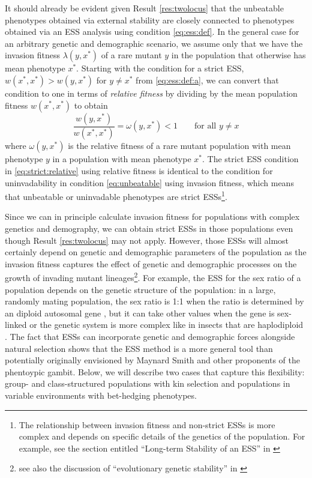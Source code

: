 \documentclass[11pt]{article}
\newcommand{\ess}[1]{#1^*}
\newcommand{\eig}{\lambda}
\begin{document}
It should already be evident given Result \ref{res:twolocus} that the unbeatable phenotypes obtained via external stability are closely connected to phenotypes obtained via an ESS analysis using condition \eqref{eq:ess:def}. In the general case for an arbitrary genetic and demographic scenario, we assume only that we have the invasion fitness $\eig(y, \ess{x})$ of a rare mutant $y$ in the population that otherwise has mean phenotype $\ess{x}$. Starting with the condition for a strict ESS, $w(\ess{x}, \ess{x}) > w(y, \ess{x})$ for $y \ne \ess{x}$ from \eqref{eq:ess:def:a}, we can convert that condition to one in terms of \textit{relative fitness} by dividing by the mean population fitness $w(\ess{x}, \ess{x})$ to obtain
\begin{equation}
  \label{eq:strict:relative}
  \frac{w(y, \ess{x})}{w(\ess{x}, \ess{x})} = \omega(y, \ess{x}) < 1 \qquad \text{for all } y \ne x
\end{equation}
where $\omega(y, \ess{x})$ is the relative fitness of a rare mutant population with mean phenotype $y$ in a population with mean phenotype $\ess{x}$. The strict ESS condition in \eqref{eq:strict:relative} using relative fitness is identical to the condition for uninvadability in condition \eqref{eq:unbeatable} using invasion fitness, which means that unbeatable or uninvadable phenotypes are strict ESSs\footnote{The relationship between invasion fitness and non-strict ESSs is more complex and depends on specific details of the genetics of the population. For example, see the section entitled ``Long-term Stability of an ESS'' in \cite{Eshel:Feldman:1998}}.

Since we can in principle calculate invasion fitness for populations with complex genetics and demography, we can obtain strict ESSs in those populations even though Result \ref{res:twolocus} may not apply. However, those ESSs will almost certainly depend on genetic and demographic parameters of the population as the invasion fitness captures the effect of genetic and demographic processes on the growth of invading mutant lineages\footnote{see also the discussion of ``evolutionary genetic stability'' in \cite[pp. 505--506]{Eshel:1996}}. For example, the ESS for the sex ratio of a population depends on the genetic structure of the population: in a large, randomly mating population, the sex ratio is 1:1 when the ratio is determined by an diploid autosomal gene \cite{Fisher:1958,Hamilton:1967,Eshel:Feldman:1982}, but it can take other values when the gene is sex-linked or the genetic system is more complex like in insects that are haplodiploid \cite{Hamilton:1967,Eshel:Feldman:1982a}. The fact that ESSs can incorporate genetic and demographic forces alongside natural selection shows that the ESS method is a more general tool than potentially originally envisioned by Maynard Smith and other proponents of the phentoypic gambit. Below, we will describe two cases that capture this flexibility: group- and class-structured populations with kin selection and populations in variable environments with bet-hedging phenotypes.
\end{document}

